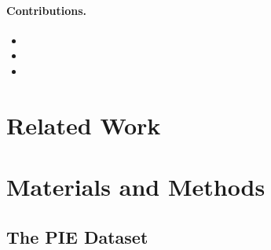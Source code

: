 \paragraph{Contributions.}
\begin{itemize}
  \item %
  \item %
  \item %
\end{itemize}

\section{Related Work}

\section{Materials and Methods}

\subsection{The PIE Dataset}

